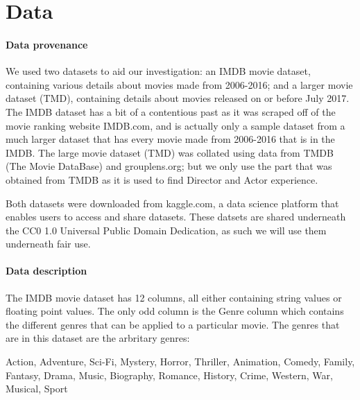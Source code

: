 \section{Data}

    \paragraph{Data provenance}
        We used two datasets to aid our investigation: an IMDB movie dataset, containing
            various details about movies made from 2006-2016; and a larger movie dataset (TMD),
            containing details about movies released on or before July 2017.
        The IMDB dataset has a bit of a contentious past as it was scraped off of the movie
            ranking website IMDB.com, and is actually only a sample dataset from a much larger
            dataset that has every movie made from 2006-2016 that is in the IMDB.
        The large movie dataset (TMD) was collated using data from TMDB (The Movie DataBase) and 
            grouplens.org; but we only use the part that was obtained from TMDB as it is used
            to find Director and Actor experience.

        Both datasets were downloaded from kaggle.com, a data science platform that enables users
            to access and share datasets. These datsets are shared underneath the CC0 1.0 Universal
            Public Domain Dedication, as such we will use them underneath fair use.

    \paragraph{Data description}
        The IMDB movie dataset has 12 columns, all either containing string values or floating point values.
        The only odd column is the Genre column which contains the different genres that can be applied to a particular movie.
        The genres that are in this dataset are the arbritary genres: 
            
        Action, Adventure, Sci-Fi, Mystery, Horror, Thriller, Animation, Comedy, Family, Fantasy, Drama, Music, Biography, Romance, History, Crime, Western, War, Musical, Sport
        
